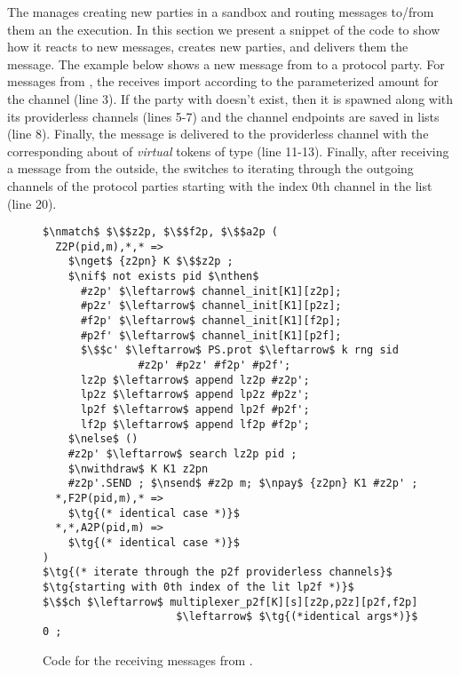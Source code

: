 The \partywrapper manages creating new parties in a sandbox and routing messages to/from them an the execution. 
In this section we present a snippet of the \partywrapper code to show how it reacts to new messages, creates new parties, and delivers them the message.
The example below shows a new message from \Z to a protocol party. 
For messages from \Z, the \partywrapper receives import according to the parameterized amount for the  channel (line 3).
If the party with  doesn't exist, then it is spawned along with its providerless channels (lines 5-7) and the channel endpoints are saved in lists (line 8).  
Finally, the message is delivered to the providerless channel with the corresponding about of \emph{virtual} tokens of type  (line 11-13). 
Finally, after receiving a message from the outside, the \partywrapper switches to iterating through the outgoing channels of the protocol parties starting with the index 0th channel in the  list (line 20).

\begin{figure}[h]
	\centering
	\begin{lstlisting}[basicstyle=\footnotesize\BeraMonottFamily, mathescape, frame=single]
$\nmatch$ $\$$z2p, $\$$f2p, $\$$a2p (
  Z2P(pid,m),*,* =>
    $\nget$ {z2pn} K $\$$z2p ;
    $\nif$ not exists pid $\nthen$
      #z2p' $\leftarrow$ channel_init[K1][z2p]; 
      #p2z' $\leftarrow$ channel_init[K1][p2z];
      #f2p' $\leftarrow$ channel_init[K1][f2p]; 
      #p2f' $\leftarrow$ channel_init[K1][p2f];
      $\$$c' $\leftarrow$ PS.prot $\leftarrow$ k rng sid 
               #z2p' #p2z' #f2p' #p2f';
      lz2p $\leftarrow$ append lz2p #z2p'; 
      lp2z $\leftarrow$ append lp2z #p2z';
      lp2f $\leftarrow$ append lp2f #p2f'; 
      lf2p $\leftarrow$ append lf2p #f2p';
    $\nelse$ ()
    #z2p' $\leftarrow$ search lz2p pid ;
    $\nwithdraw$ K K1 z2pn
    #z2p'.SEND ; $\nsend$ #z2p m; $\npay$ {z2pn} K1 #z2p' ;
  *,F2P(pid,m),* =>
    $\tg{(* identical case *)}$
  *,*,A2P(pid,m) =>
    $\tg{(* identical case *)}$
)
$\tg{(* iterate through the p2f providerless channels}$
$\tg{starting with 0th index of the lit lp2f *)}$
$\$$ch $\leftarrow$ multiplexer_p2f[K][s][z2p,p2z][p2f,f2p] 
                     $\leftarrow$ $\tg{(*identical args*)}$ 0 ;
	\end{lstlisting}
\caption{Code for the \partywrapper receiving messages from \Z.}
\label{lst:partywrapper}
\end{figure}

